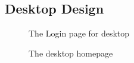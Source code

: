     \subsection{Desktop Design}
    \begin{figure}[H]
        \centering
        \caption{The Login page for desktop}
        \label{login-page}
    \end{figure}
    \begin{figure}[H]
        \centering
        \caption{The desktop homepage}
        \label{home-page}
    \end{figure}
